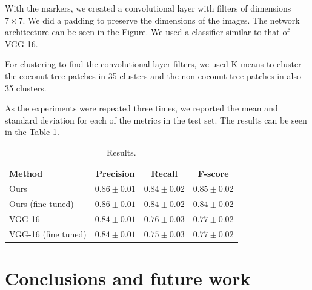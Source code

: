 \documentclass[a4paper,conference]{IEEEtran}
\begin{document}
With the markers, we created a convolutional layer with filters of dimensions $7 \times 7$. We did a padding to preserve the dimensions of the images. The network architecture can be seen in the Figure. We used a classifier similar to that of VGG-16.

For clustering to find the convolutional layer filters, we used K-means to cluster the coconut tree patches in 35 clusters and the non-coconut tree patches in also 35 clusters.

As the experiments were repeated three times, we reported the mean and standard deviation for each of the metrics in the test set. The results can be seen in the Table \ref{tab:results}.

\begin{table}[h]
  \begin{center}
  \begin{tabular}{|l|c|c|c|}
  \hline
   Method & Precision & Recall & F-score \\
  \hline\hline
  Ours & $0.86 \pm 0.01$ & $0.84 \pm 0.02$ & $0.85 \pm 0.02$\\
  Ours (fine tuned) & $0.86 \pm 0.01$ & $0.84 \pm 0.02$ & $0.84 \pm 0.02$\\
  VGG-16 & $0.84 \pm 0.01$ & $0.76 \pm 0.03$ & $0.77 \pm 0.02 $ \\
  VGG-16 (fine tuned) & $0.84 \pm 0.01$ & $0.75 \pm 0.03$ & $0.77 \pm 0.02 $ \\
  \hline
  \end{tabular}
  \end{center}
  \caption{Results.}
  \label{tab:results}
  \end{table}
  

\section{Conclusions and future work}



\end{document}
